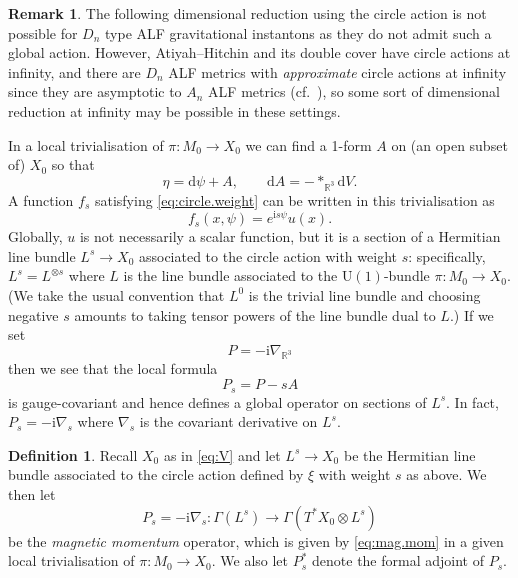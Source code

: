 \documentclass{article}
\theoremstyle{definition}
\newtheorem{dfn}[thm]{Definition}
\newtheorem{rmk}[thm]{Remark}
\numberwithin{thm}{section}
\numberwithin{equation}{section}
\def\R{\mathbb{R}}
\newcommand{\ii}{\mathrm i}
\newcommand{\dd}{\mathrm d}
\begin{document}
\begin{rmk}
    The following dimensional reduction using the circle action is not possible for $D_n$ type ALF gravitational instantons as they do not admit such a global action.  However, Atiyah--Hitchin and its double cover have circle actions at infinity, and there are $D_n$ ALF metrics with \emph{approximate} circle actions at infinity since they are asymptotic to $A_n$ ALF metrics  (cf.~\cite{SchroersSinger}), so some sort of dimensional reduction at infinity may be possible in these settings. 
\end{rmk}

In a local trivialisation of $\pi:M_0\to X_0$ we can find a 1-form $A$ on (an open subset of) $X_0$ so that
\begin{equation}\label{eq:localA}
        \eta=\dd\psi+A,
        \qquad
        \dd A=-*_{\R^3}\dd V.
\end{equation}
A function $f_s$ satisfying \eqref{eq:circle.weight} can be written in this trivialisation as
\begin{equation}\label{eq:fs.u}
        f_s(x,\psi)=e^{\ii s\psi}u(x).
\end{equation}
Globally, $u$ is not necessarily a scalar function, but it is a section of a   Hermitian line bundle $L^s\to X_0$ associated to the circle action with weight $s$: specifically, $L^s=L^{\otimes s}$ where $L$ is the line bundle associated  to the $\mathrm{U}(1)$-bundle $\pi:M_0\to X_0$.  (We take the usual convention that $L^0$ is the trivial line bundle and choosing negative $s$ amounts to taking tensor powers of the line bundle dual to $L$.)  If we set
\begin{equation}\label{eq:P}
        P=-\ii\nabla_{\R^3}
\end{equation}
then we see that the local formula
\begin{equation}\label{eq:mag.mom}
    P_s=P-sA
\end{equation}
 is gauge-covariant and hence defines a global operator on sections of $L^s$.  In fact, $P_s=-\ii\nabla_s$ where $\nabla_s$ is the covariant derivative on $L^s$.

 \begin{dfn}\label{dfn:Ps} Recall $X_0$ as in \eqref{eq:V} and let $L^s\to X_0$ be the Hermitian line bundle associated to the circle action defined by $\xi$ with weight $s$ as above.  We then let \begin{equation}
     P_s=-\ii\nabla_s:\Gamma(L^s)\to\Gamma(T^*X_0\otimes L^s)
     \end{equation} 
     be the \emph{magnetic momentum} operator, which is given by \eqref{eq:mag.mom} in a given local trivialisation of $\pi:M_0\to X_0$.  We also let $P_s^*$ denote the formal adjoint of $P_s$.
 \end{dfn}
\end{document}
